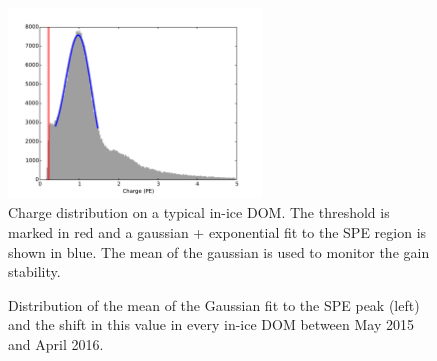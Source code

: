 \begin{figure}[!h]
 \centering
 \includegraphics[width=0.6\textwidth]{graphics/dom/reliability/chargedist.pdf}
 \caption{Charge distribution on a typical in-ice DOM. The threshold
   is marked in red and a gaussian + exponential fit to
   the SPE region is shown in blue. The mean of the gaussian is used
   to monitor the gain stability.}
 \label{fig:spe_fit_thresh}
\end{figure}

\begin{figure}[!h]
  \captionsetup[subfigure]{labelformat=empty}
  \centering
  \caption{Distribution of the mean of the Gaussian fit to the SPE
    peak (left) and the shift in this value in every in-ice DOM between  May 2015 and April
   2016.}
  \label{fig:gain_spe_stability}
\end{figure} 

